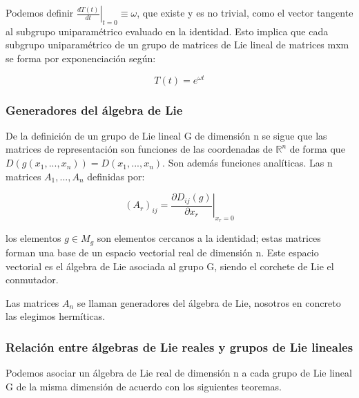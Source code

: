 \documentclass{article}
\begin{document}
     \smallskip
    Podemos definir $\left . \frac{dT(t)}{dt}\right |_{t=0}\equiv \omega$, que existe y es no trivial, como el vector tangente al subgrupo uniparamétrico evaluado en la identidad. Esto implica que cada subgrupo uniparamétrico de un grupo de matrices de Lie lineal de matrices mxm se forma por exponenciación según:

    $$T(t)=e^{\omega t}$$

    \subsubsection{Generadores del álgebra de Lie}

     De la definición de un grupo de Lie lineal G de dimensión n se sigue que las matrices de representación son funciones de las coordenadas de $\mathds{R}^n$ de forma que $D(g(x_1,...,x_n))=D(x_1,...,x_n)$. Son además funciones analíticas. Las n matrices $A_1,..., A_n$ definidas por:

     $$\left . (A_r)_{ij}=\frac{\partial D_{ij}(g)}{\partial x_r} \right |_{x_r=0}$$

     los elementos $g\in M_g$ son elementos cercanos a la identidad; estas matrices forman una base de un espacio vectorial real de dimensión n. Este espacio vectorial es el álgebra de Lie asociada al grupo G, siendo el corchete de Lie el conmutador.

     Las matrices $A_n$ se llaman generadores del álgebra de Lie, nosotros en concreto las elegimos hermíticas.


     \subsubsection{Relación entre álgebras de Lie reales y grupos de Lie lineales}

     Podemos asociar un álgebra de Lie real de dimensión n a cada grupo de Lie lineal G de la misma dimensión de acuerdo con los siguientes teoremas.
\end{document}
